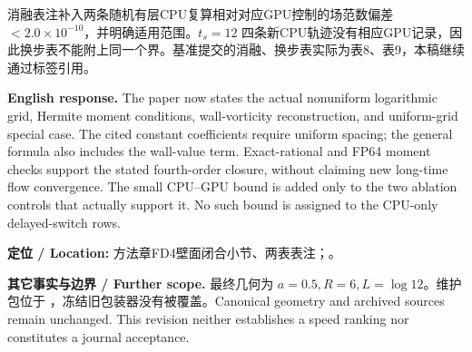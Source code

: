 消融表注补入两条随机有层CPU复算相对对应GPU控制的场范数偏差 $<2.0\times10^{-10}$，并明确适用范围。$t_s=12$ 四条新CPU轨迹没有相应GPU记录，因此换步表不能附上同一个界。基准提交的消融、换步表实际为表8、表9，本稿继续通过标签引用。

\noindent\textbf{English response.}
The paper now states the actual nonuniform logarithmic grid, Hermite moment conditions, wall-vorticity reconstruction, and uniform-grid special case. The cited constant coefficients require uniform spacing; the general formula also includes the wall-value term. Exact-rational and FP64 moment checks support the stated fourth-order closure, without claiming new long-time flow convergence. The small CPU--GPU bound is added only to the two ablation controls that actually support it. No such bound is assigned to the CPU-only delayed-switch rows.

\noindent\textbf{定位 / Location:} 方法章FD4壁面闭合小节、两表表注；。

\noindent\textbf{其它事实与边界 / Further scope.}
最终几何为 $a=0.5,R=6,L=\log12$。维护包位于 ，冻结旧包装器没有被覆盖。Canonical geometry and archived sources remain unchanged. This revision neither establishes a speed ranking nor constitutes a journal acceptance.
